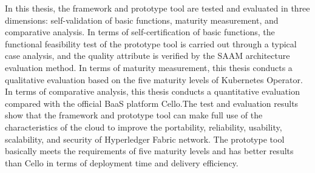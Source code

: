 \documentclass[macfonts,master,twoside]{njuthesis}
\begin{document}
\begin{englishabstract}
  In this thesis, the framework and prototype tool are tested and evaluated in three dimensions: self-validation of basic functions, maturity measurement, and comparative analysis. In terms of self-certification of basic functions, the functional feasibility test of the prototype tool is carried out through a typical case analysis, and the quality attribute is verified by the SAAM architecture evaluation method. In terms of maturity measurement, this thesis conducts a qualitative evaluation based on the five maturity levels of Kubernetes Operator. In terms of comparative analysis, this thesis conducts a quantitative evaluation compared with the official BaaS platform Cello.The test and evaluation results show that the framework and prototype tool can make full use of the characteristics of the cloud to improve the portability, reliability, usability, scalability, and security of Hyperledger Fabric network. The prototype tool basically meets the requirements of five maturity levels and has better results than Cello in terms of deployment time and delivery efficiency.
  
\end{englishabstract}


%
%
%
%

\tableofcontents

\listoffigures

\listoftables

\mainmatter

\end{document}
